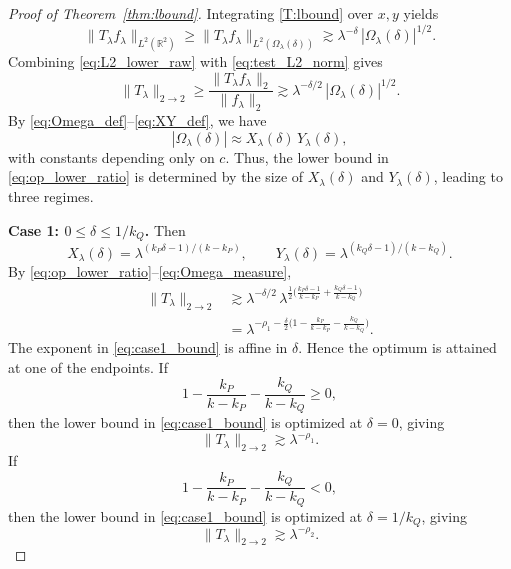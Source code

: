 \documentclass[10pt]{amsart}
\numberwithin{equation}{section}
\theoremstyle{definition}
\theoremstyle{remark}
\theoremstyle{remark}
\newcommand{\R}{\mathbb{R}}
\begin{document}
\begin{proof}[Proof of Theorem~\ref{thm:lbound}]
		Integrating \eqref{T:lbound} over $x,y$ yields
		\begin{equation}\label{eq:L2_lower_raw}
			\|T_\lambda f_\lambda\|_{L^2(\R^2)}
			\ge \|T_\lambda f_\lambda\|_{L^2(\Omega_\lambda(\delta))}
			\gtrsim \lambda^{-\delta}\,|\Omega_\lambda(\delta)|^{1/2}.
		\end{equation}
		Combining \eqref{eq:L2_lower_raw} with \eqref{eq:test_L2_norm} gives
		\begin{equation}\label{eq:op_lower_ratio}
			\|T_\lambda\|_{2\to2}
			\ge \frac{\|T_\lambda f_\lambda\|_2}{\|f_\lambda\|_2}
			\gtrsim \lambda^{-\delta/2}\,|\Omega_\lambda(\delta)|^{1/2}.
		\end{equation}
		By \eqref{eq:Omega_def}--\eqref{eq:XY_def}, we have
		\begin{equation}\label{eq:Omega_measure}
			|\Omega_\lambda(\delta)| \approx X_\lambda(\delta)\,Y_\lambda(\delta),
		\end{equation}
		with constants depending only on $c$.
		Thus, the lower bound in \eqref{eq:op_lower_ratio} is determined by the size of
		$X_\lambda(\delta)$ and $Y_\lambda(\delta)$, leading to three regimes.
		
		\smallskip
		\noindent\textbf{Case 1: $0\le \delta\le 1/k_Q$.}
		Then
		\[
		X_\lambda(\delta)=\lambda^{(k_P\delta-1)/(k-k_P)},
		\qquad
		Y_\lambda(\delta)=\lambda^{(k_Q\delta-1)/(k-k_Q)}.
		\]
		By \eqref{eq:op_lower_ratio}--\eqref{eq:Omega_measure},
		\begin{align}
			\|T_\lambda\|_{2\to2}
			&\gtrsim \lambda^{-\delta/2}\,
			\lambda^{\frac12\bigl(\frac{k_P\delta-1}{k-k_P}+\frac{k_Q\delta-1}{k-k_Q}\bigr)}\nonumber\\
			&=\lambda^{-\rho_1-\frac{\delta}{2}\bigl(1-\frac{k_P}{k-k_P}-\frac{k_Q}{k-k_Q}\bigr)}.\label{eq:case1_bound}
		\end{align}
		The exponent in \eqref{eq:case1_bound} is affine in $\delta$. Hence the optimum is attained at one of the endpoints.
		If
		\[
		1-\frac{k_P}{k-k_P}-\frac{k_Q}{k-k_Q}\ge 0,
		\]
		then the lower bound in \eqref{eq:case1_bound} is optimized at $\delta=0$, giving
		\[
		\|T_\lambda\|_{2\to2}\gtrsim \lambda^{-\rho_1}.
		\]
		If
		\[
		1-\frac{k_P}{k-k_P}-\frac{k_Q}{k-k_Q}<0,
		\]
		then the lower bound in \eqref{eq:case1_bound} is optimized at $\delta=1/k_Q$, giving
		\[
		\|T_\lambda\|_{2\to2}\gtrsim \lambda^{-\rho_2}.
		\]
		

\end{proof}
\end{document}
